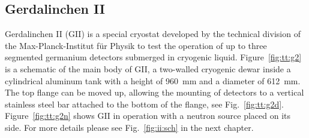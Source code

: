 \subsection{Gerdalinchen II}
\label{sec:tt:gii}
Gerdalinchen II (GII) is a special cryostat developed by the technical
division of the Max-Planck-Institut f\"ur Physik to test the operation
of up to three segmented germanium detectors submerged in cryogenic
liquid. Figure~\ref{fig:tt:g2} is a schematic of the main body of GII,
a two-walled cryogenic dewar inside a cylindrical aluminum tank with a
height of 960~mm and a diameter of 612~mm. The top flange can be moved
up, allowing the mounting of detectors to a vertical stainless steel
bar attached to the bottom of the flange, see
Fig.~\ref{fig:tt:g2d}. Figure~\ref{fig:tt:g2n} shows GII in operation
with a neutron source placed on its side. For more details please see
Fig.~\ref{fig:ii:sch} in the next chapter.

